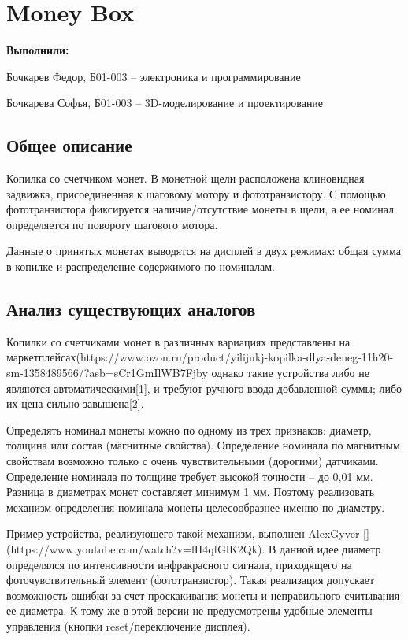 \section*{Money Box}

\textbf{Выполнили:}

Бочкарев Федор, Б01-003 -- электроника и программирование

Бочкарева Софья, Б01-003 -- 3D-моделирование и проектирование

\subsection {Общее описание}

Копилка со счетчиком монет. В монетной щели расположена клиновидная задвижка, присоединенная к шаговому мотору и фототранзистору. С помощью фототранзистора фиксируется наличие/отсутствие монеты в щели, а ее номинал определяется по повороту шагового мотора.

Данные о принятых монетах выводятся на дисплей в двух режимах: общая сумма в копилке и распределение содержимого по номиналам.

\subsection {Анализ существующих аналогов}

Копилки со счетчиками монет в различных вариациях представлены на маркетплейсах(https://www.ozon.ru/product/yilijukj-kopilka-dlya-deneg-11h20-sm-1358489566/?asb=sCr1GmIlWB7Fjby%
однако такие устройства либо не являются автоматическими[1], и требуют ручного ввода добавленной суммы; либо их цена сильно завышена[2].

Определять номинал монеты можно по одному из трех признаков: диаметр, толщина или состав (магнитные свойства). Определение номинала по магнитным свойствам возможно только с очень чувствительными (дорогими) датчиками. Определение номинала по толщине требует высокой точности -- до 0,01 мм. Разница в диаметрах монет составляет минимум 1 мм. Поэтому реализовать механизм определения номинала монеты целесообразнее именно по диаметру.

Пример устройства, реализующего такой механизм, выполнен AlexGyver [](https://www.youtube.com/watch?v=lH4qfGlK2Qk). В данной идее диаметр определялся по интенсивности инфракрасного сигнала, приходящего на фоточувствительный элемент (фототранзистор).  Такая реализация допускает возможность ошибки за счет проскакивания монеты и неправильного считывания ее диаметра. К тому же в этой версии не предусмотрены удобные элементы управления (кнопки reset/переключение дисплея).


